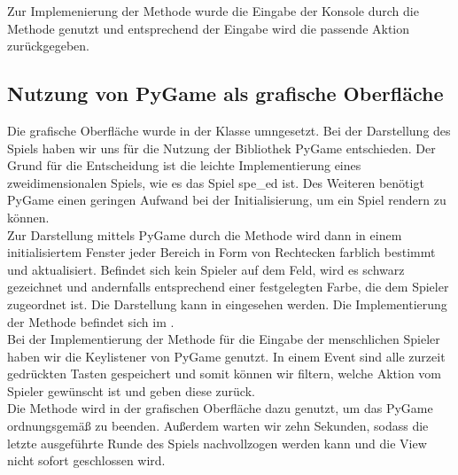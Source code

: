 Zur Implemenierung der Methode  wurde die Eingabe der Konsole durch die Methode 
genutzt und entsprechend der Eingabe wird die passende Aktion zurückgegeben.

\subsection{Nutzung von PyGame als grafische Oberfläche}
\label{subsec:oberflaeche-pygame}

Die grafische Oberfläche wurde in der Klasse  umngesetzt.
Bei der Darstellung des Spiels haben wir uns für die Nutzung der Bibliothek PyGame entschieden.
Der Grund für die Entscheidung ist die leichte Implementierung eines zweidimensionalen Spiels, wie es das Spiel
spe\_ed ist.
Des Weiteren benötigt PyGame einen geringen Aufwand bei der Initialisierung, um ein Spiel rendern zu können. \\

Zur Darstellung mittels PyGame durch die Methode  wird dann in einem initialisiertem Fenster
jeder Bereich in Form von Rechtecken farblich bestimmt und aktualisiert.
Befindet sich kein Spieler auf dem Feld, wird es schwarz gezeichnet und andernfalls entsprechend einer festgelegten
Farbe, die dem Spieler zugeordnet ist.
Die Darstellung kann in  eingesehen werden.
Die Implementierung der Methode befindet sich im . \\

Bei der Implementierung der Methode  für die Eingabe der menschlichen Spieler haben wir die
Keylistener von PyGame genutzt.
In einem Event sind alle zurzeit gedrückten Tasten gespeichert und somit können wir filtern, welche Aktion vom Spieler
gewünscht ist und geben diese zurück. \\

Die Methode  wird in der grafischen Oberfläche dazu genutzt, um das PyGame ordnungsgemäß zu beenden.
Außerdem warten wir zehn Sekunden, sodass die letzte ausgeführte Runde des Spiels nachvollzogen werden kann und die
View nicht sofort geschlossen wird.